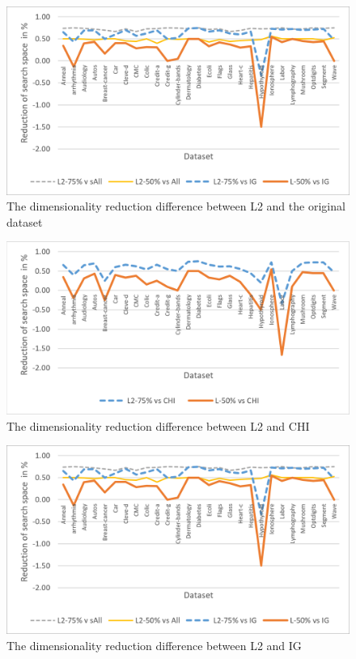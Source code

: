 \documentclass[review]{elsarticle}
\begin{document}
\begin{figure}[h]
	\centering
	\includegraphics[width=0.8\linewidth]{figs/fig_3a}
	\caption[fig 3a]{The dimensionality reduction difference between L2 and the original dataset}
	\label{fig:fig3a}
\end{figure}


\begin{figure}[h]
	\centering
	\includegraphics[width=0.8\linewidth]{figs/fig_3b}
	\caption[fig 3b]{The dimensionality reduction difference between L2 and CHI}
	\label{fig:fig3b}
\end{figure}


\begin{figure}[h]
	\centering
	\includegraphics[width=0.8\linewidth]{figs/fig_3a}
	\caption[fig 3c]{The dimensionality reduction difference between L2 and IG}
	\label{fig:fig3c}
\end{figure}
\end{document}
